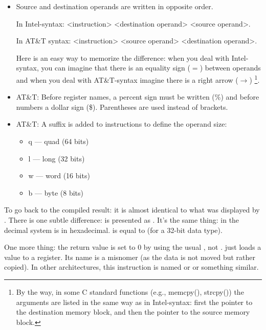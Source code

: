 \begin{itemize}

\item
Source and destination operands are written in opposite order.

In Intel-syntax: <instruction> <destination operand> <source operand>.

In AT\&T syntax: <instruction> <source operand> <destination operand>.

Here is an easy way to memorize the difference:
when you deal with Intel-syntax, you can imagine that there is an equality sign ($=$) between operands
and when you deal with AT\&T-syntax imagine there is a right arrow ($\rightarrow$)
\footnote{By the way, in some C standard functions (e.g., memcpy(), strcpy()) the arguments
are listed in the same way as in Intel-syntax: first the pointer to the destination memory block, and then
the pointer to the source memory block.}.

\item
AT\&T: Before register names, a percent sign must be written (\%) and before numbers a dollar sign (\$).
Parentheses are used instead of brackets.

\item
AT\&T: A suffix is added to instructions to define the operand size:

\begin{itemize}
\item q --- quad (64 bits)
\item l --- long (32 bits)
\item w --- word (16 bits)
\item b --- byte (8 bits)
\end{itemize}


\end{itemize}

To go back to the compiled result: it is almost identical to what was displayed by \IDA.
There is one subtle difference:  is presented as .
It's the same thing:  in the decimal system is  in hexadecimal.
 is equal to  (for a 32-bit data type).

One more thing: the return value is set to 0 by using the usual \MOV, not \XOR.
\MOV just loads a value to a register.
Its name is a misnomer (as the data is not moved but rather copied). In other architectures, this instruction is named  or  or something similar.
